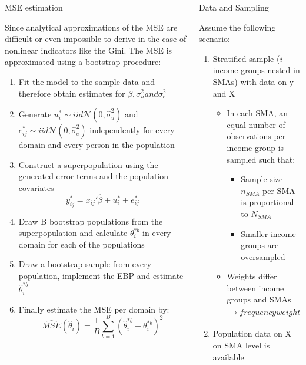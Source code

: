 \documentclass[fleqn,final]{beamer}
\newcommand{\Pheight}{\rule[-5mm]{0cm}{1cm}}
\begin{document}
\begin{frame}
\begin{columns}[t]
\begin{column}{.3\linewidth}
\begin{block}{MSE estimation \Pheight}
Since analytical approximations of the MSE are difficult or even impossible to derive in the case of nonlinear indicators like the Gini. The MSE is approximated using a bootstrap procedure:
\begin{enumerate}
\item Fit the model to the sample data and therefore obtain estimates for $\beta, \sigma_{u}^2 and \sigma_{e}^2$
\item Generate $u_{i}^*\sim iid \mathcal{N}(0,\hat{\sigma}_{u}^2)$ and  $e_{ij}^*\sim iid \mathcal{N}(0,\hat{\sigma}_{e}^2)$ independently for every domain and every person in the population
\item Construct a superpopulation using the generated error terms and the population covariates
\[y_{ij}^*=x_{ij}\prime\hat{\beta}+u_{i}^*+e_{ij}^*\]
\item Draw B bootstrap populations from the superpopulation and calculate $\theta_{i}^{*b}$ in every domain for each of the populations
\item Draw a bootstrap sample from every population, implement the EBP and estimate $\hat{\theta}_{i}^{*b}$
\item Finally estimate the MSE per domain by: 
\[\hat{MSE}(\hat{\theta}_{i})=\frac{1}{B}\sum_{b=1}^B (\hat{\theta}_{i}^{*b}-\theta_{i}^{*b})^2\]
\end{enumerate}
\end{block}
\end{column}    



%



\begin{column}{.3\linewidth}

 \begin{block}{Data and Sampling \Pheight}

Assume the following scenario: 
\begin{enumerate}
\item Stratified sample ($i$ income groups nested in SMAs) with data on y and X
\begin{itemize}
\item In each SMA, an equal number of observations per income group is sampled such that:
\begin{itemize}
\item Sample size $n_{SMA}$ per SMA is proportional to  $N_{SMA}$ 
\item Smaller income groups are oversampled
\end{itemize}
\item Weights differ between income groups and SMAs
$\rightarrow frequency weights_{SMA, income group} = {\frac {N_{SMA,income group}} {n_{SMA}/i}} $
\end{itemize}
\item Population data on X on SMA level is available



\end{enumerate}
\end{block}
\end{column}
\end{columns}
\end{frame}
\end{document}
